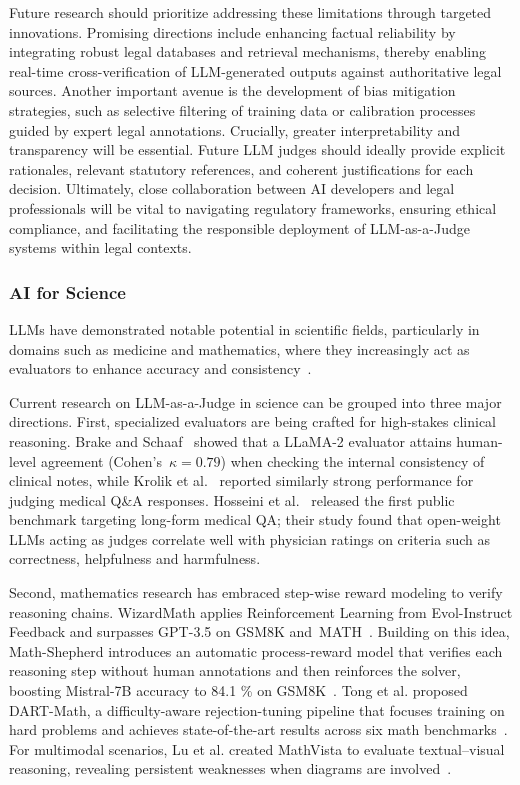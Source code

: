 \documentclass[acmsmall,screen]{acmart}
\begin{document}
Future research should prioritize addressing these limitations through targeted innovations. Promising directions include enhancing factual reliability by integrating robust legal databases and retrieval mechanisms, thereby enabling real-time cross-verification of LLM-generated outputs against authoritative legal sources. Another important avenue is the development of bias mitigation strategies, such as selective filtering of training data or calibration processes guided by expert legal annotations. Crucially, greater interpretability and transparency will be essential. Future LLM judges should ideally provide explicit rationales, relevant statutory references, and coherent justifications for each decision. Ultimately, close collaboration between AI developers and legal professionals will be vital to navigating regulatory frameworks, ensuring ethical compliance, and facilitating the responsible deployment of LLM-as-a-Judge systems within legal contexts.


\subsubsection{\textbf{AI for Science}}

LLMs have demonstrated notable potential in scientific fields, particularly in domains such as medicine and mathematics, where they increasingly act as evaluators to enhance accuracy and consistency~\cite{inno_infectious_diseases_zhou2024harnessing,inno_medicine_tang2024llms,inno_aigeo_zhao2024artificial}.  

Current research on LLM-as-a-Judge in science can be grouped into three major directions. First, specialized evaluators are being crafted for high-stakes clinical reasoning. Brake and Schaaf~\cite{brake2024comparing} showed that a LLaMA-2 evaluator attains human-level agreement (Cohen’s~$\kappa\!=\!0.79$) when checking the internal consistency of clinical notes, while Krolik et al.~\cite{krolik2024towards} reported similarly strong performance for judging medical Q\&A responses. Hosseini et al.~\cite{hosseini2024longform} released the first public benchmark targeting long-form medical QA; their study found that open-weight LLMs acting as judges correlate well with physician ratings on criteria such as correctness, helpfulness and harmfulness.

Second, mathematics research has embraced step-wise reward modeling to verify reasoning chains. WizardMath applies Reinforcement Learning from Evol-Instruct Feedback and surpasses GPT-3.5 on GSM8K and~MATH~\cite{wizardmath2023}. Building on this idea, Math-Shepherd introduces an automatic process-reward model that verifies each reasoning step without human annotations and then reinforces the solver, boosting Mistral-7B accuracy to 84.1 \% on GSM8K~\cite{wang2023mathshepherd}. Tong et al. proposed DART-Math, a difficulty-aware rejection-tuning pipeline that focuses training on hard problems and achieves state-of-the-art results across six math benchmarks~\cite{tong2024dart}. For multimodal scenarios, Lu et al. created MathVista to evaluate textual–visual reasoning, revealing persistent weaknesses when diagrams are involved~\cite{lu2023mathvista}.
\end{document}

